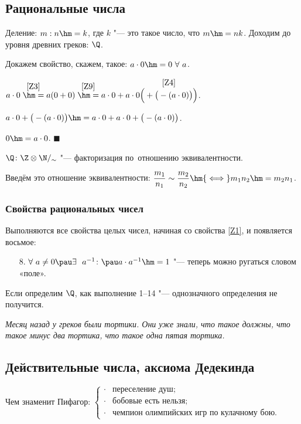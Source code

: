 \documentclass[a4paper,10pt,twoside]{article}
\newenvironment{Proof}
       {\par\noindent{\textbf{Доказательство.}}}
       {\hfill$\scriptstyle\blacksquare$}
\begin{document}
\subsection{Рациональные числа}
Деление: $m:n\hm=k$, где $k$ "--- это такое число, что $m\hm=nk$. Доходим до уровня древних греков: $\Q$.

Докажем свойство, скажем, такое: $a\cdot 0\hm=0 \ \forall\  a$.

\begin{Proof}
$a\cdot 0\overset{\ref{Z3}}{\hm=}a(0+0)\overset{\ref{Z9}}{\hm=}a\cdot0+a\cdot0\overset{\ref{Z4}}
{\Big(+\big(-(a\cdot0)\big)\Big)}$.

$a\cdot0+\big(-(a\cdot0)\big)\hm=a\cdot0+a\cdot0+\big(-(a\cdot0)\big)$.

$0\hm=a\cdot0$.
\end{Proof}

$\Q\colon \Z\otimes\N/_\sim$ "--- факторизация по~отношению эквивалентности.

Введём это отношение эквивалентности: $\dfrac{m_1}{n_1}\sim\dfrac{m_2}{n_2}\hm{\iff} m_1n_2\hm=m_2n_1$.

\subsubsection{Свойства рациональных чисел} Выполняются все свойства целых чисел, начиная со свойства  \ref{Z1},
 и появляется \label{1-14} восьмое:
 \begin{itemize}\item[8.]\label{Q8}$\forall\  a\neq 0\pau \exists\ \ a^{-1}\colon \pau a\cdot a^{-1}\hm=1$ "--- теперь можно ругаться словом «поле».\end{itemize}

Если определим $\Q$, как выполнение 1--14 "--- однозначного определения не получится.

\textit{Месяц назад у греков были тортики. Они уже знали, что такое должны, что такое минус два тортика, что такое одна пятая тортика.}

\subsection{Действительные числа, аксиома Дедекинда}

Чем знаменит Пифагор: $\begin{cases}
\cdot&\text{переселение душ};\\
\cdot&\text{бобовые есть нельзя};\\
\cdot&\text{чемпион олимпийских игр по~кулачному бою}.
\end{cases}$
\end{document}
